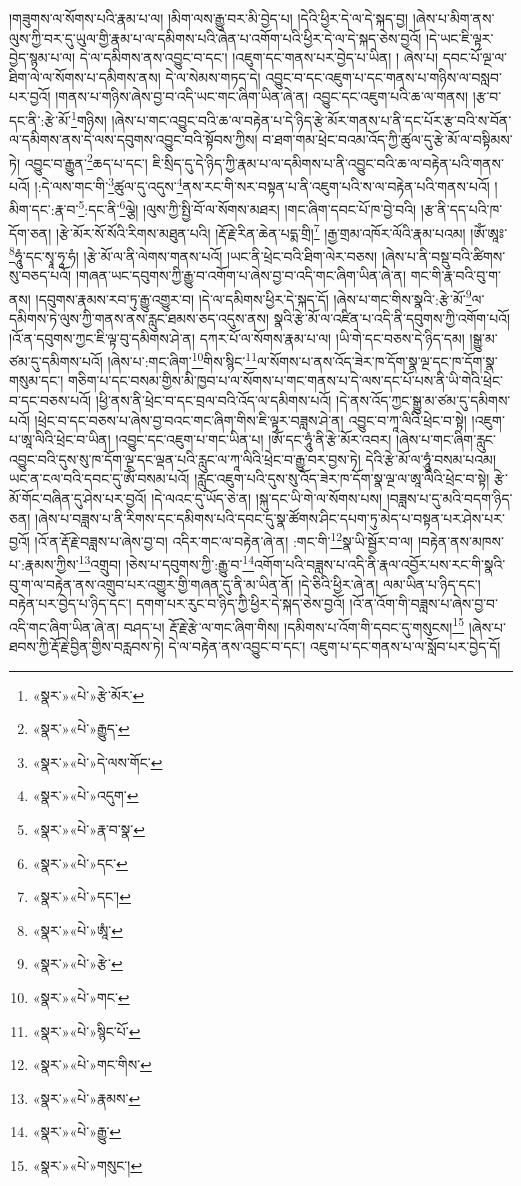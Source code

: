།གཟུགས་ལ་སོགས་པའི་རྣམ་པ་ལ། །མིག་ལས་རྒྱུ་བར་མི་བྱེད་པ། །དེའི་ཕྱིར་དེ་ལ་དེ་སྐད་བྱ། །ཞེས་པ་མིག་ནས་ལུས་ཀྱི་བར་དུ་ཡུལ་གྱི་རྣམ་པ་ལ་དམིགས་པའི་ཞེན་པ་འགོག་པའི་ཕྱིར་དེ་ལ་དེ་སྐད་ཅེས་བྱའོ། །དེ་ཡང་ཇི་ལྟར་བྱེད་སྙམ་པ་ལ། དེ་ལ་དམིགས་ནས་འབྱུང་བ་དང་། །འཇུག་དང་གནས་པར་བྱེད་པ་ཡིན། །
ཞེས་པ། དབང་པོ་ལྔ་ལ་ཐིག་ལེ་ལ་སོགས་པ་དམིགས་ནས། དེ་ལ་སེམས་གཏད་དེ། འབྱུང་བ་དང་འཇུག་པ་དང་གནས་པ་གཉིས་ལ་བསླབ་པར་བྱའོ། །གནས་པ་གཉིས་ཞེས་བྱ་བ་འདི་ཡང་གང་ཞིག་ཡིན་ཞེ་ན། འབྱུང་དང་འཇུག་པའི་ཆ་ལ་གནས། །རྩ་བ་དང་ནི་:རྩེ་མོ་\footnote{«སྣར་»«པེ་»རྩེ་མོར་}གཉིས། །ཞེས་པ་གང་འབྱུང་བའི་ཆ་ལ་བརྟེན་པ་དེ་ཉིད་རྩེ་མོར་གནས་པ་ནི་དང་པོར་རྩ་བའི་ས་བོན་ལ་དམིགས་ནས་དེ་ལས་དབུགས་འབྱུང་བའི་སྟོབས་ཀྱིས། བ་ཐག་གམ་ཕྲེང་བའམ་འོད་ཀྱི་ཚུལ་དུ་རྩེ་མོ་ལ་བསྟིམས་ཏེ། འབྱུང་བ་རྒྱུན་\footnote{«སྣར་»«པེ་»རྒྱུད་}ཆད་པ་དང་། ཇི་སྲིད་དུ་དེ་ཉིད་ཀྱི་རྣམ་པ་ལ་དམིགས་པ་ནི་འབྱུང་བའི་ཆ་ལ་བརྟེན་པའི་གནས་པའོ། །:དེ་ལས་གང་གི་\footnote{«སྣར་»«པེ་»དེ་ལས་གོང་}ཚུལ་དུ་འདུས་\footnote{«སྣར་»«པེ་»འདུག་}ནས་རང་གི་སར་བསྟན་པ་ནི་འཇུག་པའི་ས་ལ་བརྟེན་པའི་གནས་པའོ། །མིག་དང་:རྣ་བ་\footnote{«སྣར་»«པེ་»རྣ་བ་སྣ་}:དང་ནི་\footnote{«སྣར་»«པེ་»དང་}ལྕེ། །ལུས་ཀྱི་སྤྱི་བོ་ལ་སོགས་མཐར། །གང་ཞིག་དབང་པོ་ཁ་བྱེ་བའི། །རྩ་ནི་དད་པའི་ཁ་དོག་ཅན། །རྩེ་མོར་སོ་སོའི་རིགས་མཐུན་པའི། །རྡོ་རྗེ་རིན་ཆེན་པདྨ་གྲི།\footnote{«སྣར་»«པེ་»དང་།} །རྒྱ་གྲམ་འཁོར་ལོའི་རྣམ་པའམ། །ཨོཾ་ཨཱཿ་\footnote{«སྣར་»«པེ་»ཨཱཾ་}ཧཱུཾ་དང་སྭཱ་ཧཱ་ཧཾ། །རྩེ་མོ་ལ་ནི་ལེགས་གནས་པའོ། །ཡང་ནི་ཕྲེང་བའི་ཐིག་ལེར་བཅས། །ཞེས་པ་ནི་བསྡུ་བའི་ཚིགས་སུ་བཅད་པའོ། །གཞན་ཡང་དབུགས་ཀྱི་རྒྱུ་བ་འགོག་པ་ཞེས་བྱ་བ་འདི་གང་ཞིག་ཡིན་ཞེ་ན། གང་གི་རྣ་བའི་བུ་ག་ནས། །དབུགས་རྣམས་རབ་ཏུ་རྒྱུ་འགྱུར་བ། །དེ་ལ་དམིགས་ཕྱིར་དེ་སྐད་དོ། །ཞེས་པ་གང་གིས་སྣའི་:རྩེ་མོ་\footnote{«སྣར་»«པེ་»རྩེ་}ལ་དམིགས་ཏེ་ལུས་ཀྱི་གནས་ནས་རླུང་ཐམས་ཅད་འདུས་ནས། སྣའི་རྩེ་མོ་ལ་འཛིན་པ་འདི་ནི་དབུགས་ཀྱི་འགོག་པའོ། །འོ་ན་དབུགས་ཀྱང་ཇི་ལྟ་བུ་དམིགས་ཤེ་ན། དཀར་པོ་ལ་སོགས་རྣམ་པ་ལ། །ཡི་གེ་དང་བཅས་དེ་ཉིད་དམ། །སྒྱུ་མ་ཙམ་དུ་དམིགས་པའོ། །ཞེས་པ་:གང་ཞིག་\footnote{«སྣར་»«པེ་»གང་}གིས་སྙིང་\footnote{«སྣར་»«པེ་»སྙིང་པོ་}ལ་སོགས་པ་ནས་འོད་ཟེར་ཁ་དོག་སྣ་ལྔ་དང་ཁ་དོག་སྣ་གསུམ་དང་། གཅིག་པ་དང་བསམ་གྱིས་མི་ཁྱབ་པ་ལ་སོགས་པ་གང་གནས་པ་དེ་ལས་དང་པོ་པས་ནི་ཡི་གེའི་ཕྲེང་བ་དང་བཅས་པའོ། །ཕྱི་ནས་ནི་ཕྲེང་བ་དང་བྲལ་བའི་འོད་ལ་དམིགས་པའོ། །དེ་ནས་འོད་ཀྱང་སྒྱུ་མ་ཙམ་དུ་དམིགས་པའོ། །ཕྲེང་བ་དང་བཅས་པ་ཞེས་བྱ་བའང་གང་ཞིག་གིས་ཇི་ལྟར་བཟླས་ཤེ་ན། འབྱུང་བ་ཀཱ་ལིའི་ཕྲེང་བ་སྟེ། །འཇུག་པ་ཨཱ་ལིའི་ཕྲེང་བ་ཡིན། །འབྱུང་དང་འཇུག་པ་གང་ཡིན་པ། །ཨོཾ་དང་ཧཱུཾ་ནི་རྩེ་མོར་འབར། །ཞེས་པ་གང་ཞིག་རླུང་འབྱུང་བའི་དུས་སུ་ཁ་དོག་ལྔ་དང་ལྡན་པའི་རླུང་ལ་ཀཱ་ལིའི་ཕྲེང་བ་རྒྱུ་བར་བྱས་ཏེ། དེའི་རྩེ་མོ་ལ་ཧཱུཾ་བསམ་པའམ། ཡང་ན་ངལ་བའི་དབང་དུ་ཨོཾ་བསམ་པའོ། །རླུང་འཇུག་པའི་དུས་སུ་འོད་ཟེར་ཁ་དོག་སྣ་ལྔ་ལ་ཨཱ་ལིའི་ཕྲེང་བ་སྟེ། རྩེ་མོ་གོང་བཞིན་དུ་ཤེས་པར་བྱའོ། །དེ་ལའང་དུ་ཡོད་ཅེ་ན། །སྐུ་དང་ཡི་གེ་ལ་སོགས་པས། །བཟླས་པ་དུ་མའི་བདག་ཉིད་ཅན། །ཞེས་པ་བཟླས་པ་ནི་རིགས་དང་དམིགས་པའི་དབང་དུ་སྣ་ཚོགས་ཤིང་དཔག་ཏུ་མེད་པ་བསྟན་པར་ཤེས་པར་བྱའོ། །འོ་ན་རྡོ་རྗེ་བཟླས་པ་ཞེས་བྱ་བ། འདིར་གང་ལ་བརྟེན་ཞེ་ན། :གང་གི་\footnote{«སྣར་»«པེ་»གང་གིས་}སྣ་ཡི་སྦྱོར་བ་ལ། །བརྟེན་ནས་མཁས་པ་:རྣམས་ཀྱིས་\footnote{«སྣར་»«པེ་»རྣམས་}འགྲུབ། །ཅེས་པ་དབུགས་ཀྱི་:རྒྱུ་བ་\footnote{«སྣར་»«པེ་»རྒྱུ་}འགོག་པའི་བཟླས་པ་འདི་ནི་རྣལ་འབྱོར་པས་རང་གི་སྣའི་བུ་ག་ལ་བརྟེན་ནས་འགྲུབ་པར་འགྱུར་གྱི་གཞན་དུ་ནི་མ་ཡིན་ནོ། །དེ་ཅིའི་ཕྱིར་ཞེ་ན། ལམ་ཡིན་པ་ཉིད་དང་། བརྟེན་པར་བྱེད་པ་ཉིད་དང་། དགག་པར་རུང་བ་ཉིད་ཀྱི་ཕྱིར་དེ་སྐད་ཅེས་བྱའོ། །འོ་ན་འོག་གི་བཟླས་པ་ཞེས་བྱ་བ་འདི་གང་ཞིག་ཡིན་ཞེ་ན། བཤད་པ། རྡོ་རྗེ་རྩེ་ལ་གང་ཞིག་གིས། །དམིགས་པ་འོག་གི་དབང་དུ་གསུངས།\footnote{«སྣར་»«པེ་»གསུང་།} །ཞེས་པ་ཐབས་ཀྱི་རྡོ་རྗེ་བྱིན་གྱིས་བརླབས་ཏེ། དེ་ལ་བརྟེན་ནས་འབྱུང་བ་དང་། འཇུག་པ་དང་གནས་པ་ལ་སློབ་པར་བྱེད་དོ། 